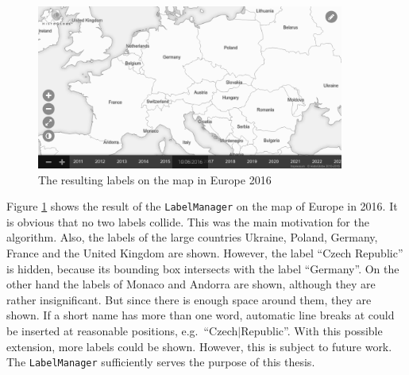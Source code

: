 \begin{figure}[ht]
  \vspace{1em}
  \centering
  \includegraphics[width=0.9\textwidth]{graphics/development/implementation/label_manager.png}
  \caption{The resulting labels on the map in Europe 2016}
  \label{fig:label_manager}
\end{figure}

Figure \ref{fig:label_manager} shows the result of the \texttt{LabelManager} on the map of Europe in 2016. It is obvious that no two labels collide. This was the main motivation for the algorithm. Also, the labels of the large countries Ukraine, Poland, Germany, France and the United Kingdom are shown. However, the label ``Czech Republic'' is hidden, because its bounding box intersects with the label ``Germany''. On the other hand the labels of Monaco and Andorra are shown, although they are rather insignificant. But since there is enough space around them, they are shown.
If a short name has more than one word, automatic line breaks at could be inserted at reasonable positions, e.g.\ ``Czech$|$Republic''. With this possible extension, more labels could be shown.
However, this is subject to future work.
The \texttt{LabelManager} sufficiently serves the purpose of this thesis.




